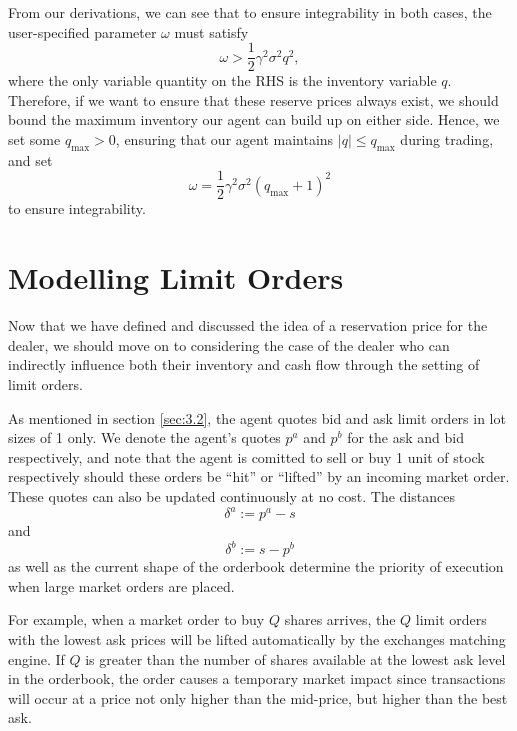 From our derivations, we can see that to ensure integrability in both cases, the 
user-specified parameter $\omega$ must satisfy
\begin{equation*}
    \omega>\frac{1}{2}\gamma^2\sigma^2q^2,
\end{equation*}
where the only variable quantity on the RHS is the inventory variable $q$. Therefore,
if we want to ensure that these reserve prices always exist, we should bound the maximum
inventory our agent can build up on either side. Hence, we set some $q_{\textrm{max}}>0$,
ensuring that our agent maintains $|q|\leq q_{\textrm{max}}$ during trading, and set
\begin{equation*}
    \omega=\frac{1}{2}\gamma^2\sigma^2(q_{\textrm{max}}+1)^2
\end{equation*}
to ensure integrability.

\section{Modelling Limit Orders}\label{sec:3.5}
Now that we have defined and discussed the idea of a reservation price
for the dealer, we should move on to considering the case of the dealer
who can indirectly influence both their inventory and cash flow through
the setting of limit orders. 

As mentioned in section \ref{sec:3.2},
the agent quotes bid and ask limit orders in lot sizes of 1 only.
We denote the agent's quotes $p^a$ and $p^b$ for the ask and bid respectively,
and note that the agent is comitted to sell or buy 1 unit of stock respectively
should these orders be ``hit'' or ``lifted'' by an incoming market order.
These quotes can also be updated continuously at no cost. The distances
\begin{equation}
    \delta^a:=p^a-s
\end{equation}
and 
\begin{equation}
    \delta^b:=s-p^b
\end{equation}
as well as the current shape of the orderbook determine the priority 
of execution when large market orders are placed. 

For example, when a market order to buy $Q$ shares arrives, the $Q$ 
limit orders with the lowest ask prices will be lifted automatically
by the exchanges matching engine. If $Q$ is greater than the number
of shares available at the lowest ask level in the orderbook, the order
causes a temporary market impact since transactions will occur at a 
price not only higher than the mid-price, but higher than the best ask.

